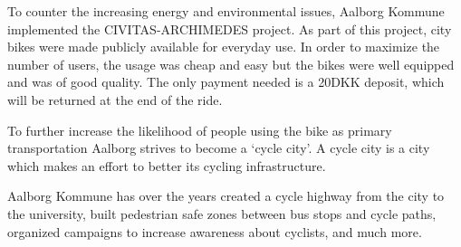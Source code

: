 To counter the increasing energy and environmental issues, Aalborg Kommune implemented the CIVITAS-ARCHIMEDES project\cite{aalborgbycyklenbagcyklen}. As part of this project, city bikes were made publicly available for everyday use.
In order to maximize the number of users, the usage was cheap and easy but the bikes were well equipped and was of good quality\cite{cykelplanlaegning}. The only payment needed is a 20DKK deposit, which will be returned at the end of the ride.

To further increase the likelihood of people using the bike as primary transportation Aalborg strives to become a `cycle city'.
A cycle city is a city which makes an effort to better its cycling infrastructure.\cite{cykelhandlingsplan}

Aalborg Kommune has over the years 
created a cycle highway from the city to the university, \cite{cykelhandlingsplan}
built pedestrian safe zones between bus stops and cycle paths\cite{pedestriansafezone},
organized campaigns to increase awareness about cyclists\cite{cykelbycampaigns},
and much more.
